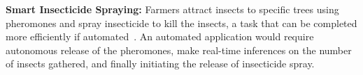     
\noindent\textbf{Smart Insecticide Spraying:} Farmers attract insects to specific trees using pheromones and spray insecticide to kill the insects, a task that can be completed more efficiently if automated~\cite{ipm-scouting, ipm-overview, ipm-greenhouse}. An automated application would require autonomous release of the pheromones, make real-time inferences on the number of insects gathered, and finally initiating the release of insecticide spray. 